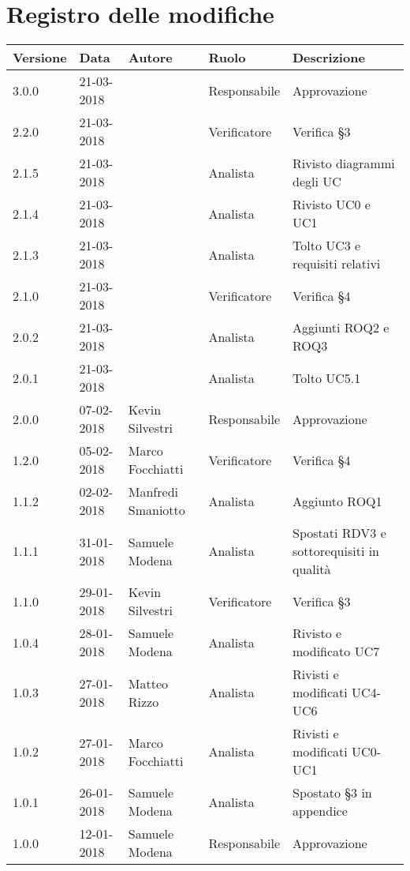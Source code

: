 \documentclass[./AnalisideiRequisiti.tex]{subfiles}
\begin{document}
	
{
	\chapter*{Registro delle modifiche}
\setlength\LTleft{-22mm}
	\begin{longtable}{|p{20mm}|p{20mm}|p{40mm}|p{30mm}|p{50mm}|}
		\hline
		\textbf{Versione} & \textbf{Data} & \textbf{Autore} & \textbf{Ruolo} & \textbf{Descrizione} \\ \hline 
		    
		3.0.0 & 21-03-2018 &  & Responsabile & Approvazione\\ \hline 
		2.2.0 & 21-03-2018 &  & Verificatore & Verifica §3\\ \hline 
		2.1.5 & 21-03-2018 &  & Analista & Rivisto diagrammi degli UC\\ \hline
		2.1.4 & 21-03-2018 &  & Analista & Rivisto UC0 e UC1\\ \hline
		2.1.3 & 21-03-2018 &  & Analista & Tolto UC3 e requisiti relativi\\ \hline
		2.1.0 & 21-03-2018 &  & Verificatore & Verifica §4\\ \hline
		2.0.2 & 21-03-2018 &  & Analista & Aggiunti ROQ2 e ROQ3\\ \hline
		2.0.1 & 21-03-2018 &  & Analista & Tolto UC5.1\\ \hline
		2.0.0 & 07-02-2018 & Kevin Silvestri & Responsabile & Approvazione\\ \hline 
		1.2.0 & 05-02-2018 & Marco Focchiatti & Verificatore & Verifica §4\\ \hline    
		1.1.2 & 02-02-2018 & Manfredi Smaniotto & Analista & Aggiunto ROQ1\\ \hline 
		1.1.1 & 31-01-2018 & Samuele Modena & Analista & Spostati RDV3 e sottorequisiti in qualità\\ \hline  
		1.1.0 & 29-01-2018 & Kevin Silvestri & Verificatore & Verifica §3\\ \hline  
		1.0.4 & 28-01-2018 & Samuele Modena & Analista & Rivisto e modificato UC7\\ \hline  
		1.0.3 & 27-01-2018 & Matteo Rizzo & Analista & Rivisti e modificati UC4-UC6\\ \hline    
		1.0.2 & 27-01-2018 & Marco Focchiatti & Analista & Rivisti e modificati UC0-UC1\\ \hline  
		1.0.1 & 26-01-2018 & Samuele Modena & Analista & Spostato §3 in appendice\\ \hline
		1.0.0 & 12-01-2018 & Samuele Modena & Responsabile & Approvazione\\ \hline

\end{longtable}}
\end{document}
